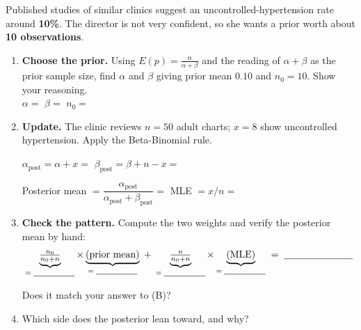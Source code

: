 \documentclass{article}
\newcommand{\blankline}[1]{\underline{\hspace{#1}}}
\begin{document}
Published studies of similar clinics suggest an uncontrolled-hypertension rate around \textbf{10\%}. The director is not very confident, so she wants a prior worth about \textbf{10 observations}.

\begin{enumerate}[label={\bfseries (\Alph*)},itemsep=.6em]
	\item \textbf{Choose the prior.} Using $E(p) = \frac{\alpha}{\alpha+\beta}$ and the reading of $\alpha + \beta$ as the prior sample size, find $\alpha$ and $\beta$ giving prior mean $0.10$ and $n_0 = 10$. Show your reasoning. \\[4em]

	$\alpha = $ \blankline{2cm} \hspace{1cm} $\beta = $ \blankline{2cm} \hspace{1cm} $n_0 = $ \blankline{2cm}

	\item \textbf{Update.} The clinic reviews $n = 50$ adult charts; $x = 8$ show uncontrolled hypertension. Apply the Beta-Binomial rule.

	\vspace{0.3em}
	$\alpha_{\text{post}} = \alpha + x = $ \blankline{2cm} \hspace{1cm} $\beta_{\text{post}} = \beta + n - x = $ \blankline{2cm}

	\vspace{0.5em}
	Posterior mean $= \dfrac{\alpha_{\text{post}}}{\alpha_{\text{post}} + \beta_{\text{post}}} = $ \blankline{3cm} \hspace{1cm} MLE $= x/n = $ \blankline{2cm}

	\item \textbf{Check the pattern.} Compute the two weights and verify the posterior mean by hand:
	\[
	\underbrace{\tfrac{n_0}{n_0+n}}_{=\;\blankline{1.5cm}} \times \underbrace{(\text{prior mean})}_{=\;\blankline{1.5cm}}
	\;+\;
	\underbrace{\tfrac{n}{n_0+n}}_{=\;\blankline{1.5cm}} \times \underbrace{(\text{MLE})}_{=\;\blankline{1.5cm}}
	\;=\; \blankline{2.5cm}
	\]

	Does it match your answer to (B)? \\[2em]

	\item Which side does the posterior lean toward, and why? \\[3em]

\end{enumerate}

\newpage
\end{document}
